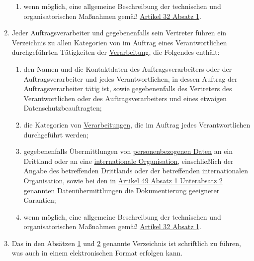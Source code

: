\begin{enumerate}
\begin{enumerate}
    \item wenn möglich, eine allgemeine Beschreibung der technischen und organisatorischen Maßnahmen gemäß
     \hyperref[itm:32-1]{Artikel 32 Absatz 1}.
    \label{itm:30-1g}

  \end{enumerate}

  \item Jeder Auftragsverarbeiter und gegebenenfalls sein Vertreter führen ein Verzeichnis zu allen Kategorien von im
   Auftrag eines Verantwortlichen durchgeführten Tätigkeiten der \hyperref[itm:04-2]{Verarbeitung}, die Folgendes enthält:
  \label{itm:30-2}

  \begin{enumerate}
  
    \item den Namen und die Kontaktdaten des Auftragsverarbeiters oder der Auftragsverarbeiter und jedes
     Verantwortlichen, in dessen Auftrag der Auftragsverarbeiter tätig ist, sowie gegebenenfalls des Vertreters des
     Verantwortlichen oder des Auftragsverarbeiters und eines etwaigen Datenschutzbeauftragten;
    \label{itm:30-2a}

    \item die Kategorien von \hyperref[itm:04-2]{Verarbeitungen}, die im Auftrag jedes Verantwortlichen durchgeführt werden;
    \label{itm:30-2b}

    \item gegebenenfalls Übermittlungen von \hyperref[itm:04-1]{personenbezogenen Daten} an ein Drittland oder an eine \hyperref[itm:04-29]{internationale
     Organisation}, einschließlich der Angabe des betreffenden Drittlands oder der betreffenden internationalen
     Organisation, sowie bei den in \hyperref[itm:49-1-2]{Artikel 49 Absatz 1 Unterabsatz 2} genannten
     Datenübermittlungen die Dokumentierung geeigneter Garantien;
    \label{itm:30-2c}

    \item wenn möglich, eine allgemeine Beschreibung der technischen und organisatorischen Maßnahmen gemäß \hyperref
     [itm:32-1]{Artikel 32 Absatz 1}.
    \label{itm:30-2d}

  \end{enumerate}

  \item Das in den Absätzen \hyperref[itm:30-1]{1} und \hyperref[itm:30-2]{2} genannte Verzeichnis ist schriftlich zu
   führen, was auch in einem elektronischen Format erfolgen kann.
  \label{itm:30-3}


\end{enumerate}
